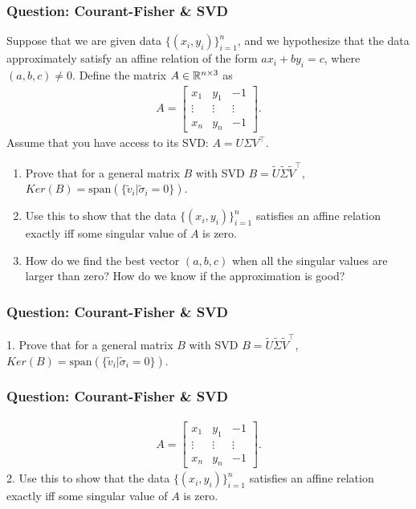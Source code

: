 \documentclass{beamer}
\begin{document}
\begin{frame}[t]
\frametitle{Question: Courant-Fisher \& SVD}
Suppose that we are given data $\{(x_i,y_i)\}_{i=1}^n$, and we hypothesize that the data approximately satisfy an affine relation of the form $a x_i + b y_i = c$, where $(a,b,c) \neq 0$. Define the matrix $A \in \mathbb{R}^{n \times 3}$ as
\begin{align*}
A = 
\begin{bmatrix}
x_1 & y_1 & -1 \\
\vdots & \vdots & \vdots \\ 
x_n & y_n & -1
\end{bmatrix}.
\end{align*}
Assume that you have access to its SVD: $A = U \Sigma V^{\top}$.
\begin{enumerate}
\item Prove that for a general matrix $B$ with SVD $B = \tilde{U} \tilde{\Sigma} \tilde{V}^{\top}$, $Ker(B) = \text{span}(\{ \tilde{v}_i | \tilde{\sigma}_i = 0 \})$.
\item Use this to show that the data $\{(x_i,y_i)\}_{i=1}^n$ satisfies an affine relation exactly iff some singular value of $A$ is zero.
\item How do we find the best vector $(a,b,c)$ when all the singular values are larger than zero? How do we know if the approximation is good?
\end{enumerate}
\end{frame}

\begin{frame}[t]
\frametitle{Question: Courant-Fisher \& SVD}
1. Prove that for a general matrix $B$ with SVD $B = \tilde{U} \tilde{\Sigma} \tilde{V}^{\top}$, $Ker(B) = \text{span}(\{ \tilde{v}_i | \tilde{\sigma}_i = 0 \})$. 
\pause
\pause
\end{frame}

\begin{frame}[t]
\frametitle{Question: Courant-Fisher \& SVD}
\vspace{-20pt}
\begin{align*}
A = 
\begin{bmatrix}
x_1 & y_1 & -1 \\
\vdots & \vdots & \vdots \\ 
x_n & y_n & -1
\end{bmatrix}.
\end{align*}
2. Use this to show that the data $\{(x_i,y_i)\}_{i=1}^n$ satisfies an affine relation exactly iff some singular value of $A$ is zero.
\pause
\end{frame}
\end{document}
